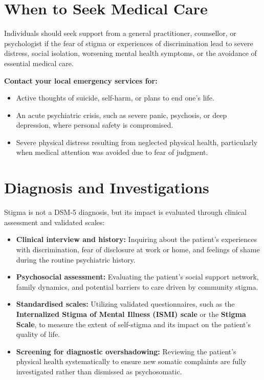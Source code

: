\section*{When to Seek Medical Care}
Individuals should seek support from a general practitioner, counsellor, or psychologist if the fear of stigma or experiences of discrimination lead to severe distress, social isolation, worsening mental health symptoms, or the avoidance of essential medical care.

\textbf{Contact your local emergency services for:}
\begin{itemize}
    \item Active thoughts of suicide, self-harm, or plans to end one's life.
    \item An acute psychiatric crisis, such as severe panic, psychosis, or deep depression, where personal safety is compromised.
    \item Severe physical distress resulting from neglected physical health, particularly when medical attention was avoided due to fear of judgment.
\end{itemize}

\section*{Diagnosis and Investigations}
Stigma is not a DSM-5 diagnosis, but its impact is evaluated through clinical assessment and validated scales:
\begin{itemize}
    \item \textbf{Clinical interview and history:} Inquiring about the patient's experiences with discrimination, fear of disclosure at work or home, and feelings of shame during the routine psychiatric history.
    \item \textbf{Psychosocial assessment:} Evaluating the patient's social support network, family dynamics, and potential barriers to care driven by community stigma.
    \item \textbf{Standardised scales:} Utilizing validated questionnaires, such as the \textbf{Internalized Stigma of Mental Illness (ISMI) scale} or the \textbf{Stigma Scale}, to measure the extent of self-stigma and its impact on the patient's quality of life.
    \item \textbf{Screening for diagnostic overshadowing:} Reviewing the patient's physical health systematically to ensure new somatic complaints are fully investigated rather than dismissed as psychosomatic.
\end{itemize}

